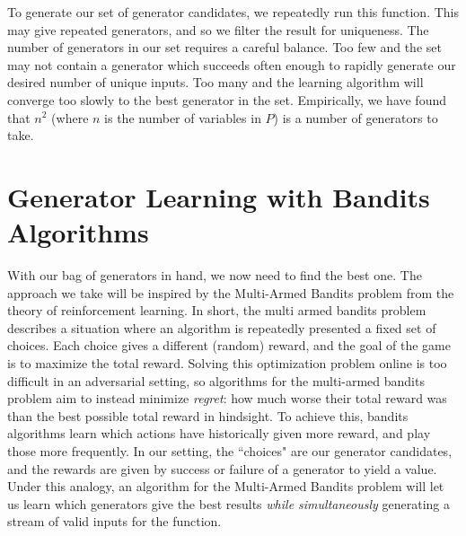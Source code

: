 \documentclass[sigconf,nonacm,review,anonymous]{acmart}
\begin{document}
      

      
      

To generate our set of generator candidates, we repeatedly run this function.
This may give repeated generators, and so we filter the result for uniqueness.
The number of generators in our set requires a careful
balance. Too few and the set may not contain a generator which succeeds often
enough to rapidly generate our desired number of unique inputs. Too many and the
learning algorithm will converge too slowly to the best generator in the set.
Empirically, we have found that $n^2$ (where $n$ is the number of variables in
$P$) is a number of generators to take.

\section{Generator Learning with Bandits Algorithms}
\label{sec:bandits}
With our bag of generators in hand, we now need to find the best one. The
approach we take will be inspired by the Multi-Armed Bandits
\cite{gittins1979bandit} problem from the theory of reinforcement learning. In short, the multi armed
bandits problem describes a situation where an algorithm is repeatedly presented
a fixed set of choices. Each choice gives a different (random) reward, and the
goal of the game is to maximize the total reward. Solving this optimization problem
online is too difficult in an adversarial setting, so algorithms for the multi-armed
bandits problem aim to instead minimize \emph{regret}: how much worse their total reward
was than the best possible total reward in hindsight. To achieve this, bandits algorithms
learn which actions have historically given more reward, and play those more frequently.
In our setting, the ``choices" are our
generator candidates, and the rewards are given by success or failure of a
generator to yield a value. Under this analogy, an algorithm for the Multi-Armed
Bandits problem will let us learn which generators give the best results
\textit{while simultaneously} generating a stream of valid inputs for the
function.
\end{document}
